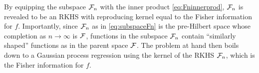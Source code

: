 \documentclass[showframe,11pt,twoside,openright]{report}
\begin{document}
By equipping the subspace ${\mathcal F}_n$ with the inner product \cref{eq:Fninnerprod}, ${\mathcal F}_n$ is revealed to be an RKHS with reproducing kernel equal to the Fisher information for $f$.
Importantly, since ${\mathcal F}_n$ as in \cref{eq:subspaceFn} is the pre-Hilbert space whose completion as $n\to\infty$ is ${\mathcal F}$, functions in the subspace ${\mathcal F}_n$ contain ``similarly shaped'' functions as in the parent space ${\mathcal F}$.
The problem at hand then boils down to a Gaussian process regression using the kernel of the RKHS ${\mathcal F}_n$, which is the Fisher information for $f$.

\hClosingStuffStandalone
\end{document}
